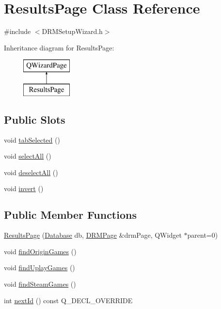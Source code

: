 \hypertarget{class_results_page}{}\section{Results\+Page Class Reference}
\label{class_results_page}


{\ttfamily \#include $<$D\+R\+M\+Setup\+Wizard.\+h$>$}

Inheritance diagram for Results\+Page\+:\begin{figure}[H]
\begin{center}
\leavevmode
\includegraphics[height=2.000000cm]{class_results_page}
\end{center}
\end{figure}
\subsection*{Public Slots}
\begin{DoxyCompactItemize}
\item 
void \hyperlink{class_results_page_a86c5a589b72b4bd229c8f9eb4bc84534}{tab\+Selected} ()
\item 
void \hyperlink{class_results_page_a3e025707664d7a1a5bfd0885b3b31522}{select\+All} ()
\item 
void \hyperlink{class_results_page_ac1cb09f124d3a899e635e603824c9ed0}{deselect\+All} ()
\item 
void \hyperlink{class_results_page_a2aac8db5fa7334c6cee18f68fdaa585f}{invert} ()
\end{DoxyCompactItemize}
\subsection*{Public Member Functions}
\begin{DoxyCompactItemize}
\item 
\hyperlink{class_results_page_ad973e062d8a7965a856969ec01b3ebae}{Results\+Page} (\hyperlink{class_database}{Database} db, \hyperlink{class_d_r_m_page}{D\+R\+M\+Page} \&drm\+Page, Q\+Widget $\ast$parent=0)
\item 
void \hyperlink{class_results_page_ad2a5dce180e18b6dacbfbe53a2681100}{find\+Origin\+Games} ()
\item 
void \hyperlink{class_results_page_a246d369ee485e493c2525ea7e2ce0bf6}{find\+Uplay\+Games} ()
\item 
void \hyperlink{class_results_page_a91347cd782f80e6d0bfa53314368e6ae}{find\+Steam\+Games} ()
\item 
int \hyperlink{class_results_page_a4b89c85a9a8bb6f289fac550512e3130}{next\+Id} () const Q\+\_\+\+D\+E\+C\+L\+\_\+\+O\+V\+E\+R\+R\+I\+D\+E
\end{DoxyCompactItemize}
